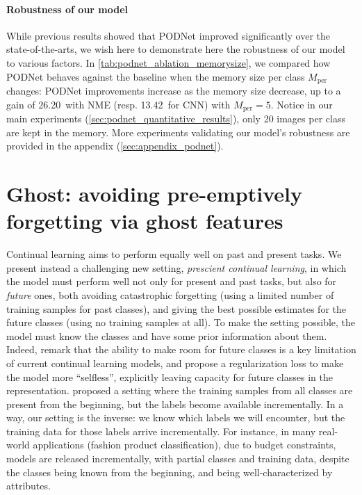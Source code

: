 \paragraph{Robustness of our model} While previous results showed that PODNet improved significantly
over the state-of-the-arts, we wish here to demonstrate here the robustness of our model to various
factors. In \autoref{tab:podnet_ablation_memorysize}, we compared how PODNet behaves against the
baseline when the memory size per class $M_{\text{per}}$ changes: PODNet improvements increase as
the memory size decrease, up to a gain of 26.20\pp\ with \ac{NME} (resp. 13.42\pp\ for CNN) with
$M_{\text{per}} = 5$. Notice in our main experiments (\autoref{sec:podnet_quantitative_results}),
only 20 images per class are kept in the memory. More experiments validating our model's robustness
are provided in the appendix (\autoref{sec:appendix_podnet}).






\FloatBarrier

\section{Ghost: avoiding pre-emptively forgetting via ghost features}
\label{sec:ghost}

Continual learning aims to perform equally well on past and present tasks. We present instead a
challenging new setting, \textit{prescient continual learning}, in which the model must perform well
not only for present and past tasks, but also for \textit{future} ones, both avoiding catastrophic
forgetting (using a limited number of training samples for past classes), and giving the best
possible estimates for the future classes (using no training samples at all). To make the setting
possible, the model must know the classes and have some prior information about them. Indeed,
\citet{aljundi2019selfless} remark that the ability to make room for future classes is a key
limitation of current continual learning models, and propose a regularization loss to make the model
more “selfless”, explicitly leaving capacity for future classes in the representation.
\citet{hanrebuffi2020autodiscovering} proposed a setting where the training samples from all classes
are present from the beginning, but the labels become available incrementally. In a way, our setting
is the inverse: we know which labels we will encounter, but the training data for those labels
arrive incrementally. For instance, in many real-world applications (\eg fashion product
classification), due to budget constraints, models are released incrementally, with partial classes
and training data, despite the classes being known from the beginning, and being well-characterized
by attributes.

